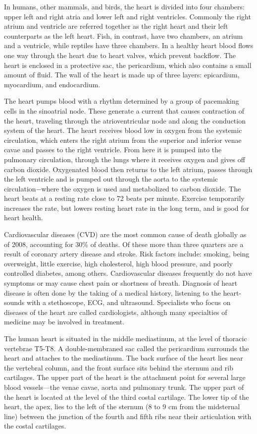 In humans, other mammals, and birds, the heart is divided into four chambers: upper left and right atria and lower left and right ventricles. Commonly the right atrium and ventricle are referred together as the right heart and their left counterparts as the left heart. Fish, in contrast, have two chambers, an atrium and a ventricle, while reptiles have three chambers. In a healthy heart blood flows one way through the heart due to heart valves, which prevent backflow. The heart is enclosed in a protective sac, the pericardium, which also contains a small amount of fluid. The wall of the heart is made up of three layers: epicardium, myocardium, and endocardium.

The heart pumps blood with a rhythm determined by a group of pacemaking cells in the sinoatrial node. These generate a current that causes contraction of the heart, traveling through the atrioventricular node and along the conduction system of the heart. The heart receives blood low in oxygen from the systemic circulation, which enters the right atrium from the superior and inferior venae cavae and passes to the right ventricle. From here it is pumped into the pulmonary circulation, through the lungs where it receives oxygen and gives off carbon dioxide. Oxygenated blood then returns to the left atrium, passes through the left ventricle and is pumped out through the aorta to the systemic circulation−where the oxygen is used and metabolized to carbon dioxide. The heart beats at a resting rate close to 72 beats per minute. Exercise temporarily increases the rate, but lowers resting heart rate in the long term, and is good for heart health.

Cardiovascular diseases (CVD) are the most common cause of death globally as of 2008, accounting for 30\% of deaths. Of these more than three quarters are a result of coronary artery disease and stroke. Risk factors include: smoking, being overweight, little exercise, high cholesterol, high blood pressure, and poorly controlled diabetes, among others. Cardiovascular diseases frequently do not have symptoms or may cause chest pain or shortness of breath. Diagnosis of heart disease is often done by the taking of a medical history, listening to the heart-sounds with a stethoscope, ECG, and ultrasound. Specialists who focus on diseases of the heart are called cardiologists, although many specialties of medicine may be involved in treatment.

The human heart is situated in the middle mediastinum, at the level of thoracic vertebrae T5-T8. A double-membraned sac called the pericardium surrounds the heart and attaches to the mediastinum. The back surface of the heart lies near the vertebral column, and the front surface sits behind the sternum and rib cartilages. The upper part of the heart is the attachment point for several large blood vessels---the venae cavae, aorta and pulmonary trunk. The upper part of the heart is located at the level of the third costal cartilage. The lower tip of the heart, the apex, lies to the left of the sternum (8 to 9 cm from the midsternal line) between the junction of the fourth and fifth ribs near their articulation with the costal cartilages.

